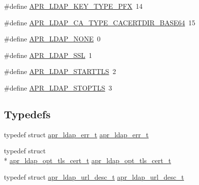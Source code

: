 \begin{DoxyCompactItemize}
\item 
\#define \hyperlink{group___a_p_r___util___l_d_a_p_ga643e937d04527c8d0001cd4ee92102e5}{A\-P\-R\-\_\-\-L\-D\-A\-P\-\_\-\-K\-E\-Y\-\_\-\-T\-Y\-P\-E\-\_\-\-P\-F\-X}~14
\item 
\#define \hyperlink{group___a_p_r___util___l_d_a_p_ga70f4f4bff0ed16ad8eae0f3362f34196}{A\-P\-R\-\_\-\-L\-D\-A\-P\-\_\-\-C\-A\-\_\-\-T\-Y\-P\-E\-\_\-\-C\-A\-C\-E\-R\-T\-D\-I\-R\-\_\-\-B\-A\-S\-E64}~15
\item 
\#define \hyperlink{group___a_p_r___util___l_d_a_p_ga005b3c879760af5d38f9dbd2e910c695}{A\-P\-R\-\_\-\-L\-D\-A\-P\-\_\-\-N\-O\-N\-E}~0
\item 
\#define \hyperlink{group___a_p_r___util___l_d_a_p_ga5e7057df19b0271f8776db8d9a5be863}{A\-P\-R\-\_\-\-L\-D\-A\-P\-\_\-\-S\-S\-L}~1
\item 
\#define \hyperlink{group___a_p_r___util___l_d_a_p_gae3b6991b3392ca2061bad18a13a2802f}{A\-P\-R\-\_\-\-L\-D\-A\-P\-\_\-\-S\-T\-A\-R\-T\-T\-L\-S}~2
\item 
\#define \hyperlink{group___a_p_r___util___l_d_a_p_gaf3b98ab3a6da25e4f3d1a4ed17106960}{A\-P\-R\-\_\-\-L\-D\-A\-P\-\_\-\-S\-T\-O\-P\-T\-L\-S}~3
\end{DoxyCompactItemize}
\subsection*{Typedefs}
\begin{DoxyCompactItemize}
\item 
typedef struct \hyperlink{structapr__ldap__err__t}{apr\-\_\-ldap\-\_\-err\-\_\-t} \hyperlink{group___a_p_r___util___l_d_a_p_ga3f8031b3eb3895e7b5557cd7ddcc9350}{apr\-\_\-ldap\-\_\-err\-\_\-t}
\item 
typedef struct \\*
\hyperlink{structapr__ldap__opt__tls__cert__t}{apr\-\_\-ldap\-\_\-opt\-\_\-tls\-\_\-cert\-\_\-t} \hyperlink{group___a_p_r___util___l_d_a_p_gaf933e3d717b8cf88b72bf45ff3906e24}{apr\-\_\-ldap\-\_\-opt\-\_\-tls\-\_\-cert\-\_\-t}
\item 
typedef struct \hyperlink{structapr__ldap__url__desc__t}{apr\-\_\-ldap\-\_\-url\-\_\-desc\-\_\-t} \hyperlink{group___a_p_r___util___l_d_a_p_ga407a61a84358557f900f745efa3c3fdd}{apr\-\_\-ldap\-\_\-url\-\_\-desc\-\_\-t}
\end{DoxyCompactItemize}
